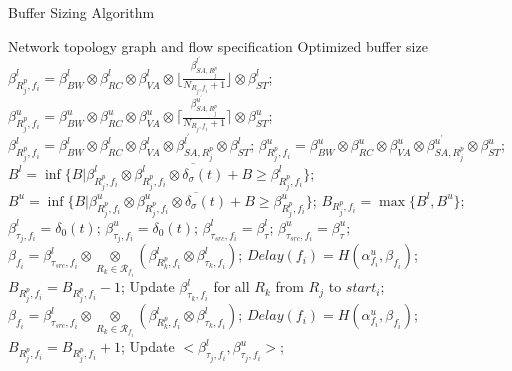 \documentclass[10pt,journal]{IEEEtran}
\begin{document}
\begin{algorithm}
\caption{Buffer Sizing Algorithm}
\label{alg:bufopt}
\begin{algorithmic}[1]
\REQUIRE Network topology graph and flow specification
\ENSURE Optimized buffer size
                \STATE $\beta_{R_j^{p},f_i}^l=\beta_{BW}^l\otimes\beta_{RC}^l\otimes\beta_{VA}^l\otimes\lfloor\frac{\beta_{SA,R_j^{p}}^{l^\prime}}{N_{R_j,f_i}+1}\rfloor\otimes\beta_{ST}^l$;
                \STATE $\beta_{R_j^{p},f_i}^u=\beta_{BW}^u\otimes\beta_{RC}^u\otimes\beta_{VA}^u\otimes\lceil\frac{\beta_{SA,R_j^{p}}^{u^\prime}}{N_{R_j,f_i}+1}\rceil\otimes\beta_{ST}^u$;
            \ELSE
                \STATE $\beta_{R_j^{p},f_i}^l=\beta_{BW}^l\otimes\beta_{RC}^l\otimes\beta_{VA}^l\otimes\beta_{SA,R_j^{p}}^{l^\prime}\otimes\beta_{ST}^l$;
                \STATE $\beta_{R_j^{p},f_i}^u=\beta_{BW}^u\otimes\beta_{RC}^u\otimes\beta_{VA}^u\otimes\beta_{SA,R_j^{p}}^{u^\prime}\otimes\beta_{ST}^u$;
            \ENDIF
            \STATE $B^l=\inf\{B|\beta_{R_j^{p},f_i}^l\otimes\overline{\beta_{R_j^{p},f_i}^l\otimes\delta_\sigma(t)+B}\geq\beta_{R_j^{p},f_i}^l\}$;
            \STATE $B^u=\inf\{B|\beta_{R_j^{p},f_i}^u\otimes\overline{\beta_{R_j^{p},f_i}^u\otimes\delta_\sigma(t)+B}\geq\beta_{R_j^{p},f_i}^u\}$;
            \STATE $B_{R_j^{p},f_i}=\max\{B^l,B^u\}$;
            \STATE $\beta_{\tau_j,f_i}^l=\delta_0(t)$; $\beta_{\tau_j,f_i}^u=\delta_0(t)$;
        \ENDFOR
        \STATE $\beta_{\tau_{src},f_i}^l=\beta^l_{\tau}$; $\beta_{\tau_{src},f_i}^u=\beta^u_{\tau}$;
            \STATE $\beta_{f_i}=\beta_{\tau_{src},f_i}^l\otimes\underset{R_k\in\mathcal{R}_{f_i}}{\otimes}(\beta^l_{R_k^p,f_i}\otimes\beta^l_{\tau_k,f_i})$;
            \STATE $Delay(f_i)=H(\alpha^u_{f_i},\beta_{f_i})$;
                \STATE $B_{R_j^p,f_i}=B_{R_j^p,f_i}-1$;
                \STATE Update $\beta_{\tau_k,f_i}^l$ for all $R_{k}$ from $R_j$ to $start_i$;
                \STATE $\beta_{f_i}=\beta_{\tau_{src},f_i}^l\otimes\underset{R_k\in\mathcal{R}_{f_i}}{\otimes}(\beta^l_{R_k^p,f_i}\otimes\beta^l_{\tau_k,f_i})$;
                \STATE $Delay(f_i)=H(\alpha^u_{f_i},\beta_{f_i})$;
            \ENDWHILE
                \STATE $B_{R_j^p,f_i}=B_{R_j^p,f_i}+1$;
                \STATE Update $<\beta_{\tau_j,f_i}^l,\beta_{\tau_j,f_i}^u>$;

\end{algorithmic}
\end{algorithm}
\end{document}
